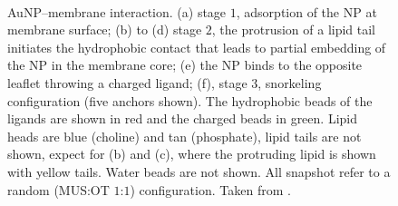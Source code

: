 \begin{figure}[t]
	\centering
	\quad%
	\quad%
	\\%
	\quad%
	\caption{\acs{AuNP}--membrane interaction. (a) stage $1$, adsorption of the \acs{NP} at membrane surface; (b) to (d) stage $2$, the protrusion of a lipid tail initiates the hydrophobic contact that leads to partial embedding of the \acs{NP} in the membrane core; (e) the \ac{NP} binds to the opposite leaflet throwing a charged ligand; (f), stage $3$, snorkeling configuration (five anchors shown). The hydrophobic beads of the ligands are shown in red and the charged beads in green. Lipid heads are blue (choline) and tan (phosphate), lipid tails are not shown, expect for (b) and (c), where the protruding lipid is shown with yellow tails. Water beads are not shown. All snapshot refer to a random (\ac{MUS}:\ac{OT} $1$:$1$) configuration. Taken from \cite{ourPaper}.}
	\label{fig:threeProcess}
\end{figure}

